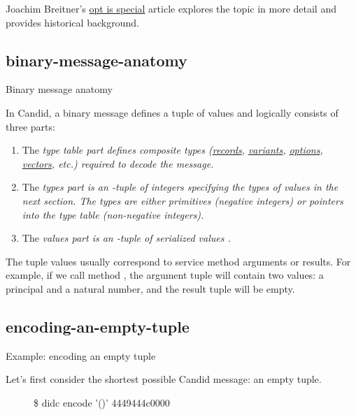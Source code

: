 \documentclass{article}
\begin{document}
Joachim Breitner's \href{https://www.joachim-breitner.de/blog/784-A_Candid_explainer__Opt_is_special}{opt is special} article explores the topic in more detail and provides historical background.

\subsection{binary-message-anatomy}{Binary message anatomy}

In Candid, a binary message defines a tuple of  values and logically consists of three parts:
\begin{enumerate}
    \item
    The \em{type table} part defines composite types (\href{https://internetcomputer.org/docs/current/references/candid-ref#type-record--n--t--}{records}, \href{https://internetcomputer.org/docs/current/references/candid-ref#type-variant--n--t--}{variants}, \href{https://internetcomputer.org/docs/current/references/candid-ref#type-opt-t}{options}, \href{https://internetcomputer.org/docs/current/references/candid-ref#type-vec-t}{vectors}, etc.) required to decode the message.
    \item
    The \em{types} part is an -tuple of integers specifying the types  of values in the next section.
    The types are either primitives (negative integers) or pointers into the type table (non-negative integers).
    \item
    The \em{values} part is an -tuple of serialized values .
\end{enumerate}

The tuple values usually correspond to service method arguments or results.
For example, if we call method , the argument tuple will contain two values: a principal and a natural number, and the result tuple will be empty.

\subsection{encoding-an-empty-tuple}{Example: encoding an empty tuple}

Let's first consider the shortest possible Candid message: an empty tuple.

\begin{figure}
\begin{code}[shell]
\$ didc encode '()'
4449444c0000
\end{code}
\end{figure}
\end{document}
